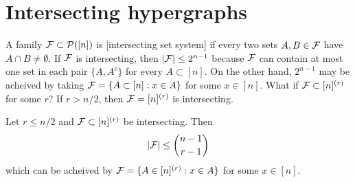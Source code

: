
\section{Intersecting hypergraphs}

A family $\mathcal{F}\subset \mathcal{P}([n])$ is [intersecting set system] if every two sets $A,B\in \mathcal{F}$ have $A\cap B\neq \emptyset$. If $\mathcal{F}$ is intersecting, then $|\mathcal{F}| \leq 2^{n-1}$ because $\mathcal{F}$ can contain at most one set in each pair $\{A,A^c\}$ for every $A\subset [n]$. On the other hand, $2^{n-1}$ may be acheived by taking $\mathcal{F} = \{A\subset [n]: x\in A\}$ for some $x\in [n]$.
What if $\mathcal{F}\subset [n]^{(r)}$ for some $r$? If $r> n/2$, then $\mathcal{F} = [n]^{(r)}$ is intersecting.

\begin{theorem} \label{thm:erdos-ko-rado} 
Let $r \leq n/2$ and $\mathcal{F}\subset[n]^{(r)}$ be intersecting. Then
\[
|\mathcal{F}| \leq {n-1\choose r-1}
\]
which can be acheived by $\mathcal{F} = \{A\in [n]^{(r)}: x\in A\}$ for some $x\in [n]$.
\end{theorem}
